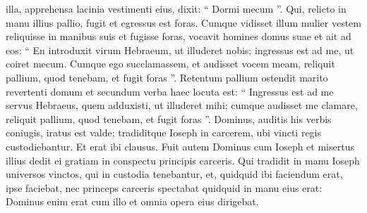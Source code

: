 \begin{biblechapter}
\begin{biblechapter}
\begin{biblechapter}
\begin{biblechapter}
\begin{biblechapter}
\begin{biblechapter}
\begin{biblechapter}
\begin{biblechapter}
\begin{biblechapter}
\begin{biblechapter}
\begin{biblechapter}
\begin{biblechapter}
\begin{biblechapter}
\begin{biblechapter}
\begin{biblechapter}
\begin{biblechapter}
\begin{biblechapter}
\begin{biblechapter}
\begin{biblechapter}
\begin{biblechapter}
\begin{biblechapter}
\begin{biblechapter}
\begin{biblechapter}
\begin{biblechapter}
\begin{biblechapter}
\begin{biblechapter}
\begin{biblechapter}
\begin{biblechapter}
\begin{biblechapter}
\begin{biblechapter}
\begin{biblechapter}
\begin{biblechapter}
\begin{biblechapter}
\begin{biblechapter}
\begin{biblechapter}
\begin{biblechapter}
\begin{biblechapter}
\begin{biblechapter}
\begin{biblechapter}
\verse illa, apprehensa lacinia vestimenti eius, dixit: “ Dormi mecum ”. Qui, relicto in manu illius pallio, fugit et egressus est foras. 
 \verse Cumque vidisset illum mulier vestem reliquisse in manibus suis et fugisse foras, 
\verse vocavit homines domus suae et ait ad eos: “ En introduxit virum Hebraeum, ut illuderet nobis; ingressus est ad me, ut coiret mecum. Cumque ego succlamassem, 
\verse et audisset vocem meam, reliquit pallium, quod tenebam, et fugit foras ”. 
\verse Retentum pallium ostendit marito revertenti domum 
\verse et secundum verba haec locuta est: “ Ingressus est ad me servus Hebraeus, quem adduxisti, ut illuderet mihi; 
\verse cumque audisset me clamare, reliquit pallium, quod tenebam, et fugit foras ”.
 \verse Dominus, auditis his verbis coniugis, iratus est valde; 
\verse tradiditque Ioseph in carcerem, ubi vincti regis custodiebantur. Et erat ibi clausus.
 \verse Fuit autem Dominus cum Ioseph et misertus illius dedit ei gratiam in conspectu principis carceris. 
\verse Qui tradidit in manu Ioseph universos vinctos, qui in custodia tenebantur, et, quidquid ibi faciendum erat, ipse faciebat, 
\verse nec princeps carceris spectabat quidquid in manu eius erat: Dominus enim erat cum illo et omnia opera eius dirigebat.
 

\end{biblechapter}
\end{biblechapter}
\end{biblechapter}
\end{biblechapter}
\end{biblechapter}
\end{biblechapter}
\end{biblechapter}
\end{biblechapter}
\end{biblechapter}
\end{biblechapter}
\end{biblechapter}
\end{biblechapter}
\end{biblechapter}
\end{biblechapter}
\end{biblechapter}
\end{biblechapter}
\end{biblechapter}
\end{biblechapter}
\end{biblechapter}
\end{biblechapter}
\end{biblechapter}
\end{biblechapter}
\end{biblechapter}
\end{biblechapter}
\end{biblechapter}
\end{biblechapter}
\end{biblechapter}
\end{biblechapter}
\end{biblechapter}
\end{biblechapter}
\end{biblechapter}
\end{biblechapter}
\end{biblechapter}
\end{biblechapter}
\end{biblechapter}
\end{biblechapter}
\end{biblechapter}
\end{biblechapter}
\end{biblechapter}
